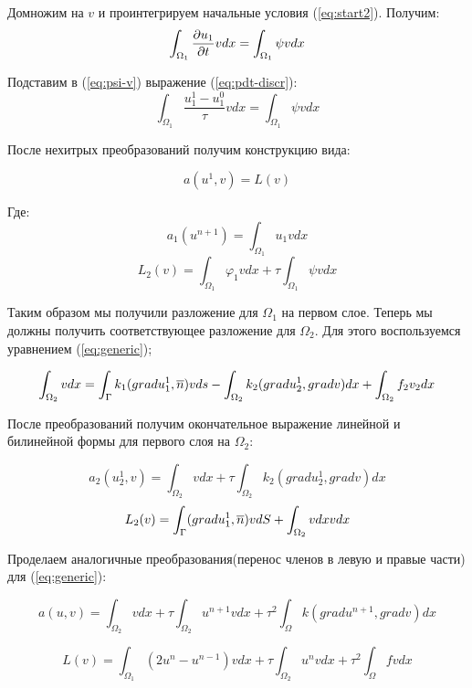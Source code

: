 Домножим на $v$ и проинтегрируем начальные условия (\ref{eq:start2}). Получим:
\begin{equation}
    \int_{\Omega_1}{\frac{\partial u_1}{\partial t}}vdx = \int_{\Omega_1}\psi vdx
    \label{eq:psi-v}
\end{equation}

Подставим в (\ref{eq:psi-v}) выражение (\ref{eq:pdt-discr}):
$$\int_{\Omega_1} \frac{u_1^1-u_1^0}{\tau}vdx = \int_{\Omega_1}\psi vdx $$

После нехитрых преобразований получим конструкцию вида:

\begin{equation}
     a(u^{1}, v) = L(v) 
     \label{eq:al-first-layer}
\end{equation}


Где:
$$ a_1(u^{n + 1}) = \int_{\Omega_1}u_1vdx $$
$$ L_2(v) = \int_{\Omega_1}\varphi_1 vdx + \tau\int_{\Omega_1}\psi vdx $$


Таким образом мы получили разложение для $\Omega_1$ на первом слое. Теперь мы должны получить соответствующее разложение для $\Omega_2$. Для этого воспользуемся уравнением (\ref{eq:generic});

$$ \int_{\Omega_2}vdx = \int_{\Gamma}k_1(gradu_1^1, \overline{n})vds - \int_{\Omega_2}k_2(gradu_2^1, gradv)dx + \int_{\Omega_2}f_2v_2dx $$

После преобразований получим окончательное выражение линейной и билинейной формы для первого слоя на $\Omega_2$:

$$ a_2(u_2^1, v) = \int_{\Omega_2}vdx + \tau\int_{\Omega_2}^{}k_2(gradu_2^1, gradv)dx $$
$$ L_2(v) = \int_{\Gamma}(gradu_1^1, \overline{n})vdS + \int_{\Omega_2}^{}vdx vdx$$

Проделаем аналогичные преобразования(перенос членов в левую и правые части) для (\ref{eq:generic}):

\begin{equation}
    a(u, v) = \int_{\Omega_2}^{}vdx + \tau\int_{\Omega_2}^{}u^{n+1}vdx + \tau^2\int_{\Omega}^{}k(gradu^{n+1}, gradv)dx
    \label{eq:a-variational-generic}
\end{equation}

\begin{equation}
    L(v) = \int_{\Omega_1}^{}(2u^n - u^{n-1})vdx + \tau\int_{\Omega_2}^{}u^nvdx + \tau^2\int_{\Omega}^{}fvdx   
    \label{}
\end{equation}
